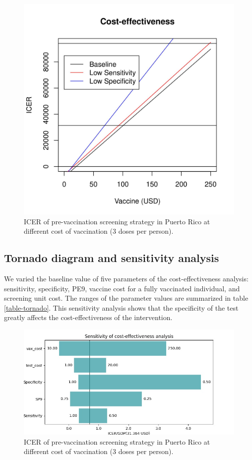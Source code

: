 \documentclass[12pt]{article}
\begin{document}
\begin{figure}[H]
  \centering
  \includegraphics[width=.7\linewidth]{../analysis/figures/report_figure_ICER.jpeg}
  \caption{ICER of pre-vaccination screening strategy in Puerto Rico at different cost of vaccination (3 doses per person).}
  \label{fig-ICER}
\end{figure}

\subsection{Tornado diagram and sensitivity analysis}
We varied the baseline value of five parameters of the cost-effectiveness analysis: sensitivity, specificity, PE9, vaccine cost for a fully vaccinated individual, and screening unit cost. The ranges of the parameter values are summarized in table \ref{table-tornado}. This sensitivity analysis shows that the specificity of the test greatly affects the cost-effectiveness of the intervention. 

\begin{figure}[H]
  \centering \includegraphics[width=.8\linewidth]{../analysis/figures/report_figure_tornado_diagram.jpeg}
  \caption{ICER of pre-vaccination screening strategy in Puerto Rico at different cost of vaccination (3 doses per person).}
  \label{fig-tornado}
\end{figure}
\end{document}
